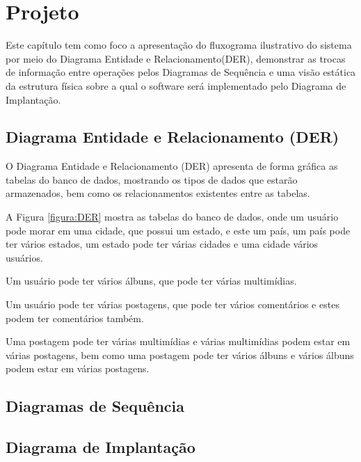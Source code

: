 \chapter{Projeto}

Este capítulo tem como foco a apresentação do fluxograma ilustrativo do sistema por meio do Diagrama Entidade e Relacionamento(DER), demonstrar as trocas de informação entre operações pelos Diagramas de Sequência e uma visão estática da estrutura física sobre a qual o software será implementado pelo Diagrama de Implantação.

\section{Diagrama Entidade e Relacionamento (DER)}

O Diagrama Entidade e Relacionamento (DER) apresenta de forma gráfica as tabelas do banco de dados, mostrando os tipos de dados que estarão armazenados, bem como os relacionamentos existentes entre as tabelas.

A Figura \ref{figura:DER} mostra as tabelas do banco de dados, onde um usuário pode morar em uma cidade, que possui um estado, e este um país, um país pode ter vários estados, um estado pode ter várias cidades e uma cidade vários usuários.

Um usuário pode ter vários álbuns, que pode ter várias multimídias.

Um usuário pode ter várias postagens, que pode ter vários comentários e estes podem ter comentários também.

Uma postagem pode ter várias multimídias e várias multimídias podem estar em várias postagens, bem como uma postagem pode ter vários álbuns e vários álbuns podem estar em várias postagens.



\section{Diagramas de Sequência}

\section{Diagrama de Implantação}
